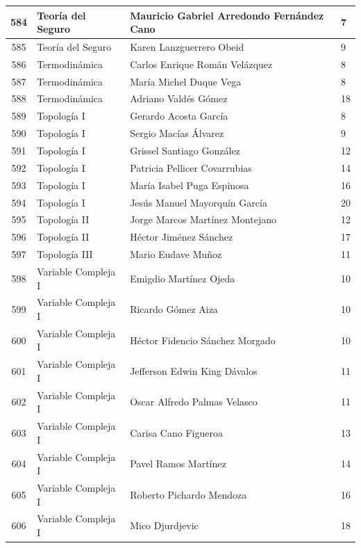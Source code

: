 {\begin{longtable}{|c|p{6.5cm}|p{5cm}|p{1.5cm}|}
584 & Teoría del Seguro & Mauricio Gabriel Arredondo Fernández Cano & 7 \\ \hline
585 & Teoría del Seguro & Karen Lanzguerrero Obeid & 9 \\ \hline
586 & Termodinámica & Carlos Enrique Román Velázquez & 8 \\ \hline
587 & Termodinámica & María Michel Duque Vega & 8 \\ \hline
588 & Termodinámica & Adriano Valdés Gómez & 18 \\ \hline
589 & Topología I & Gerardo Acosta García & 8 \\ \hline
590 & Topología I & Sergio Macías Álvarez & 9 \\ \hline
591 & Topología I & Grissel Santiago González & 12 \\ \hline
592 & Topología I & Patricia Pellicer Covarrubias & 14 \\ \hline
593 & Topología I & María Isabel Puga Espinosa & 16 \\ \hline
594 & Topología I & Jesús Manuel Mayorquín García & 20 \\ \hline
595 & Topología II & Jorge Marcos Martínez Montejano & 12 \\ \hline
596 & Topología II & Héctor Jiménez Sánchez & 17 \\ \hline
597 & Topología III & Mario Eudave Muñoz & 11 \\ \hline
598 & Variable Compleja I & Emigdio Martínez Ojeda & 10 \\ \hline
599 & Variable Compleja I & Ricardo Gómez Aiza & 10 \\ \hline
600 & Variable Compleja I & Héctor Fidencio Sánchez Morgado & 10 \\ \hline
601 & Variable Compleja I & Jefferson Edwin King Dávalos & 11 \\ \hline
602 & Variable Compleja I & Oscar Alfredo Palmas Velasco & 11 \\ \hline
603 & Variable Compleja I & Carisa Cano Figueroa & 13 \\ \hline
604 & Variable Compleja I & Pavel Ramos Martínez & 14 \\ \hline
605 & Variable Compleja I & Roberto Pichardo Mendoza & 16 \\ \hline
606 & Variable Compleja I & Mico Djurdjevic & 18 \\ \hline
\end{longtable}}






